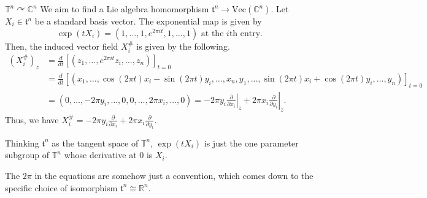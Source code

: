 \documentclass[b5paper,final]{article}
\newcommand{\acton}{\curvearrowright}
\newcommand{\vf}{\mathrm{Vec}}
\newcommand{\ind}[1]{#1^\#}
\begin{document}
\begin{example}{$\mathbb{T}^n \acton \mathbb{C}^n$}
    We aim to find a Lie algebra homomorphism $\mathfrak{t}^n \to \vf(\mathbb{C}^n)$. Let $X_i \in \mathfrak{t}^n$ be a standard basis vector. The exponential map is given by
    \begin{equation*}
        \exp(tX_i) = (1, \dots, 1, e^{2\pi it}, 1, \dots, 1) \text{ at the $i$th entry}.
    \end{equation*}
    Then, the induced vector field $\ind{X_i}$ is given by the following.
    \begin{align*}
        (\ind{X_i})_z &= \frac{d}{dt} [(z_1, \dots, e^{2\pi it} z_i, \dots, z_n)]_{t=0} \\
        &= \frac{d}{dt} [(x_1, \dots, \cos(2\pi t) x_i - \sin(2\pi t) y_i, \dots, x_n, y_1, \dots, \sin(2\pi t)x_i + \cos(2\pi t)y_i, \dots, y_n)]_{t=0} \\
        &= (0, \dots, -2\pi y_i, \dots, 0, 0, \dots, 2\pi x_i, \dots, 0) = -2\pi y_i \left.\frac{\partial}{\partial x_i}\right|_z + 2\pi x_i \left.\frac{\partial}{\partial y_i}\right|_z.
    \end{align*}
    Thus, we have $\ind{X_i} = -2\pi y_i \frac{\partial}{\partial x_i} + 2\pi x_i \frac{\partial}{\partial y_i}$.
    \begin{remark}
        Thinking $\mathfrak{t}^n$ as the tangent space of $\mathbb{T}^n$, $\exp(tX_i)$ is just the one parameter subgroup of $\mathbb{T}^n$ whose derivative at 0 is $X_i$.
    \end{remark}
    \begin{remark}
        The $2\pi$ in the equations are somehow just a convention, which comes down to the specific choice of isomorphism $\mathfrak{t}^n \cong \mathbb{R}^n$.
    \end{remark}
\end{example}

%
%
\end{document}
